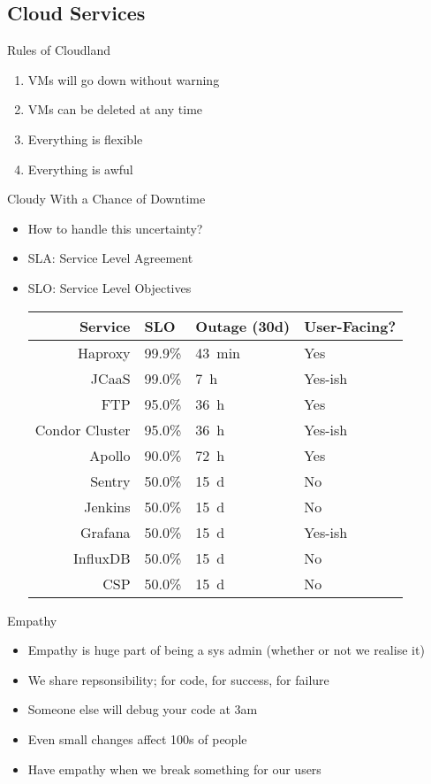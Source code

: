 \documentclass[12pt]{ufrslides}
\begin{document}
\subsection{Cloud Services}
\begin{frame}{Rules of Cloudland}
	\begin{enumerate}
		\item VMs will go down without warning
		\item VMs can be deleted at any time
		\item Everything is flexible
		\item Everything is awful
	\end{enumerate}
\end{frame}

\begin{frame}{Cloudy With a Chance of Downtime}
	\begin{itemize}
		\item How to handle this uncertainty?
		\item SLA: Service Level Agreement
		\item SLO: Service Level Objectives
			\vfill
			\begin{tabular}{rlll}
				Service        & SLO    & Outage (30d) & User-Facing? \\ \hline
			Haproxy        & 99.9\% & \SI{43}{\minute}   & Yes          \\
			JCaaS          & 99.0\% & \SI{7}{\hour}      & Yes-ish      \\
			FTP            & 95.0\% & \SI{36}{\hour}     & Yes          \\
			Condor Cluster & 95.0\% & \SI{36}{\hour}     & Yes-ish      \\
			Apollo         & 90.0\% & \SI{72}{\hour}     & Yes          \\
			Sentry         & 50.0\% & \SI{15}{\day}      & No           \\
			Jenkins        & 50.0\% & \SI{15}{\day}      & No           \\
			Grafana        & 50.0\% & \SI{15}{\day}      & Yes-ish      \\
			InfluxDB       & 50.0\% & \SI{15}{\day}      & No           \\
			CSP            & 50.0\% & \SI{15}{\day}      & No           \\
		\end{tabular}
	\end{itemize}
\end{frame}


\begin{frame}{Empathy}
	\begin{itemize}
		\item Empathy is huge part of being a sys admin (whether or not we realise it)
		\item We share repsonsibility; for code, for success, for failure
		\item Someone else will debug your code at 3am
		\item Even small changes affect 100s of people
		\item Have empathy when we break something for our users
	\end{itemize}
\end{frame}
\end{document}
